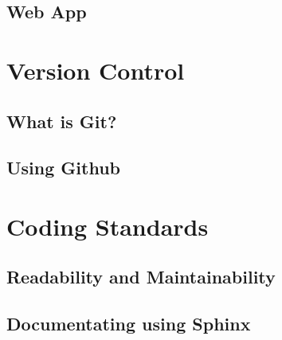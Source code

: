 \documentclass[11pt]{article}
\begin{document}
\subsection{Web App}



\newpage

\section{Version Control}

\subsection{What is Git?}



\subsection{Using Github}



\newpage

\section{Coding Standards}

\subsection{Readability and Maintainability}



\subsection{Documentating using Sphinx}



\newpage

\printbibliography
\end{document}
